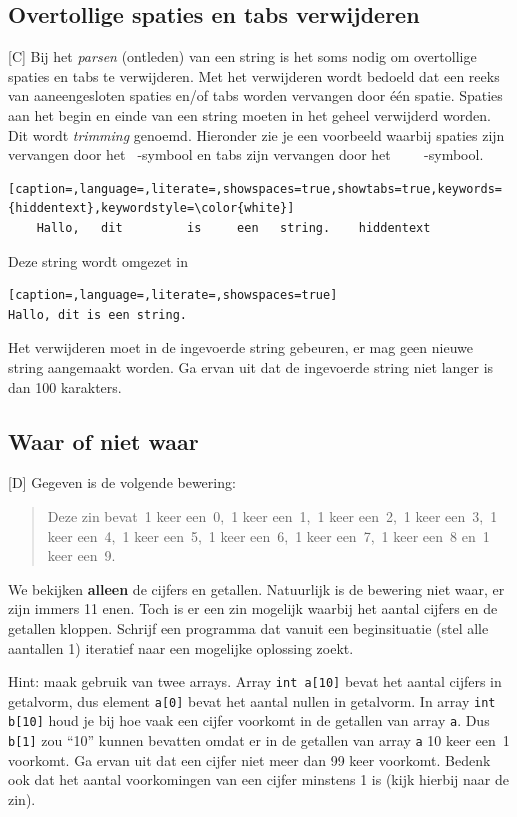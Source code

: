 \documentclass[a4paper,10pt,fleqn,twoside]{article}
\begin{document}
\subsection{Overtollige spaties en tabs verwijderen}[C]
Bij het \textsl{parsen} (ontleden) van een string is het soms nodig om overtollige spaties en tabs te verwijderen. Met het verwijderen wordt bedoeld dat een reeks van aaneengesloten spaties en/of tabs worden vervangen door één spatie. Spaties aan het begin en einde van een string moeten in het geheel verwijderd worden. Dit wordt \textsl{trimming} genoemd. Hieronder zie je een voorbeeld waarbij spaties zijn vervangen door het \lstinline[keepspaces=true,columns=fixed,showspaces=true]| |-symbool en tabs zijn vervangen door het \lstinline[showspaces=true,showtabs=true]|	|-symbool.

\begin{lstlisting}[caption=,language=,literate=,showspaces=true,showtabs=true,keywords={hiddentext},keywordstyle=\color{white}]
    Hallo,   dit 	 	 is  	een   string.    hiddentext
\end{lstlisting}

Deze string wordt omgezet in

\begin{lstlisting}[caption=,language=,literate=,showspaces=true]
Hallo, dit is een string.
\end{lstlisting}

Het verwijderen moet in de ingevoerde string gebeuren, er mag geen nieuwe string aangemaakt worden.
Ga ervan uit dat de ingevoerde string niet langer is dan 100 karakters.


\subsection{Waar of niet waar}[D]
Gegeven is de volgende bewering:
\begin{quote}
Deze zin bevat~1 keer een~0,~1 keer een~1,~1 keer een~2,~1 keer een~3,~1 keer een~4,~1 keer een~5,~1 keer een~6,~1 keer een~7,~1 keer een~8 en~1 keer een~9.
\end{quote}

We bekijken \textbf{alleen} de cijfers en getallen. Natuurlijk is de bewering niet waar, er zijn immers 11 enen. Toch is er een zin mogelijk waarbij het aantal cijfers en de getallen kloppen. Schrijf een programma dat vanuit een beginsituatie (stel alle aantallen 1) iteratief naar een mogelijke oplossing zoekt.

Hint: maak gebruik van twee arrays. Array \lstinline|int a[10]| bevat het aantal cijfers in getalvorm, dus element \lstinline|a[0]| bevat het aantal nullen in getalvorm. In array \lstinline|int b[10]| houd je bij hoe vaak een cijfer voorkomt in de getallen van array \lstinline|a|. Dus \lstinline|b[1]| zou ``10'' kunnen bevatten omdat er in de getallen van array \lstinline|a| 10 keer een~1 voorkomt. Ga ervan uit dat een cijfer niet meer dan 99 keer voorkomt. Bedenk ook dat het aantal voorkomingen van een cijfer minstens 1 is (kijk hierbij naar de zin).
\end{document}
